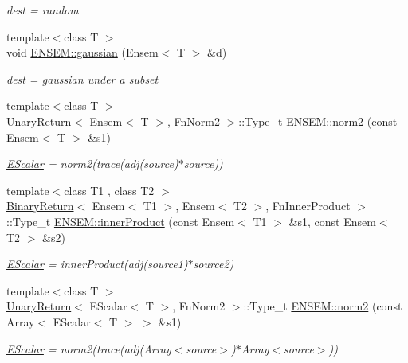 \begin{DoxyCompactItemize}
\begin{DoxyCompactList}\small\item\em dest = random \end{DoxyCompactList}\item 
{\footnotesize template$<$class T $>$ }\\void \mbox{\hyperlink{namespaceENSEM_adc1e01b99bd6ff80c11a18cf059f00de}{E\+N\+S\+E\+M\+::gaussian}} (Ensem$<$ T $>$ \&d)
\begin{DoxyCompactList}\small\item\em dest = gaussian under a subset \end{DoxyCompactList}\item 
{\footnotesize template$<$class T $>$ }\\\mbox{\hyperlink{structUnaryReturn}{Unary\+Return}}$<$ Ensem$<$ T $>$, Fn\+Norm2 $>$\+::Type\+\_\+t \mbox{\hyperlink{namespaceENSEM_a846e917e7120ca978ffdb7146357bf07}{E\+N\+S\+E\+M\+::norm2}} (const Ensem$<$ T $>$ \&s1)
\begin{DoxyCompactList}\small\item\em \mbox{\hyperlink{classENSEM_1_1EScalar}{E\+Scalar}} = norm2(trace(adj(source)$\ast$source)) \end{DoxyCompactList}\item 
{\footnotesize template$<$class T1 , class T2 $>$ }\\\mbox{\hyperlink{structBinaryReturn}{Binary\+Return}}$<$ Ensem$<$ T1 $>$, Ensem$<$ T2 $>$, Fn\+Inner\+Product $>$\+::Type\+\_\+t \mbox{\hyperlink{namespaceENSEM_a27e5add94db1e27059d44144e3a3fb99}{E\+N\+S\+E\+M\+::inner\+Product}} (const Ensem$<$ T1 $>$ \&s1, const Ensem$<$ T2 $>$ \&s2)
\begin{DoxyCompactList}\small\item\em \mbox{\hyperlink{classENSEM_1_1EScalar}{E\+Scalar}} = inner\+Product(adj(source1)$\ast$source2) \end{DoxyCompactList}\item 
{\footnotesize template$<$class T $>$ }\\\mbox{\hyperlink{structUnaryReturn}{Unary\+Return}}$<$ E\+Scalar$<$ T $>$, Fn\+Norm2 $>$\+::Type\+\_\+t \mbox{\hyperlink{namespaceENSEM_afe2995777022f093a0938da761cb5ac3}{E\+N\+S\+E\+M\+::norm2}} (const Array$<$ E\+Scalar$<$ T $>$ $>$ \&s1)
\begin{DoxyCompactList}\small\item\em \mbox{\hyperlink{classENSEM_1_1EScalar}{E\+Scalar}} = norm2(trace(adj(\+Array$<$source$>$)$\ast$\+Array$<$source$>$)) \end{DoxyCompactList}\item 

\end{DoxyCompactItemize}
